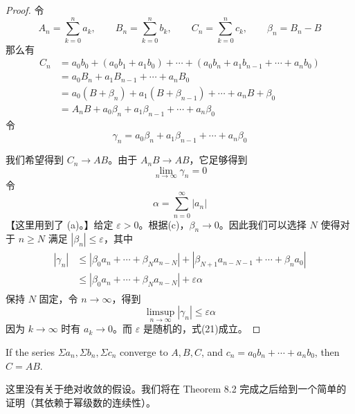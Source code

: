 \documentclass[../poma-notes.tex]{subfiles}
\begin{document}
\begin{proof}
  令
  \[
    A_n = \sum_{k=0}^{n} a_k,\qquad B_n = \sum_{k=0}^{n} b_k,\qquad C_n = \sum_{k=0}^{n} c_k,\qquad \beta_n = B_n - B
  \]
  那么有
  \begin{equation*}
    \begin{split}
      C_n & = a_0 b_0 + (a_0 b_1 + a_1 b_0) + \cdots + (a_0 b_n + a_1 b_{n-1} + \cdots + a_n b_0) \\
      & = a_0 B_n + a_1 B_{n-1} + \cdots + a_n B_0 \\
      & = a_0 (B + \beta_n) + a_1 (B + \beta_{n-1}) + \cdots + a_n {B + \beta_0} \\
      & = A_n B + a_0 \beta_n + a_1 \beta_{n-1} + \cdots + a_n \beta_0
    \end{split}
  \end{equation*}
  令
  \[
    \gamma_n = a_0 \beta_n + a_1 \beta_{n-1} + \cdots + a_n \beta_0
  \]

  我们希望得到 $C_n \to AB$。由于 $A_n B \to AB$，它足够得到
  \begin{equation}
    \lim_{n\to\infty} \gamma_n = 0
  \end{equation}
  令
  \[
    \alpha = \sum_{n=0}^{\infty} |a_n|
  \]
  【这里用到了 (a)。】给定 $\varepsilon > 0$。根据(c)，$\beta_n \to 0$。因此我们可以选择 $N$ 使得对于 $n \ge N$ 满足
  $|\beta_n| \le \varepsilon$，其中
  \begin{align*}
    \begin{split}
      |\gamma_n| & \le |\beta_0 a_n + \cdots + \beta_N a_{n-N}| + |\beta_{N+1} a_{n-N-1} + \cdots + \beta_n a_0| \\
      & \le |\beta_0 a_n + \cdots + \beta_N a_{n-N}| + \varepsilon\alpha
    \end{split}
  \end{align*}
  保持 $N$ 固定，令 $n \to \infty$，得到
  \[
    \limsup_{n\to\infty} |\gamma_n| \le \varepsilon\alpha
  \]
  因为 $k \to \infty$ 时有 $a_k \to 0$。而 $\varepsilon$ 是随机的，式(21)成立。
\end{proof}

\begin{theorem}
  If the series $\Sigma a_n, \Sigma b_n, \Sigma c_n$ converge to $A, B, C$, and $c_n = a_0 b_n + \cdots + a_n b_0$, then $C = AB$.
\end{theorem}

这里没有关于绝对收敛的假设。我们将在 Theorem 8.2 完成之后给到一个简单的证明（其依赖于幂级数的连续性）。
\end{document}

